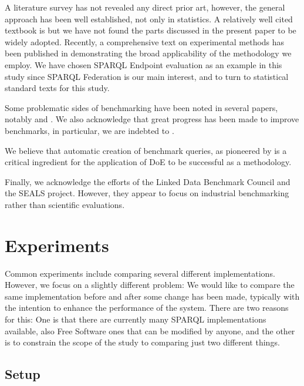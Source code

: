\documentclass{llncs}
\begin{document}
A literature survey has not revealed any direct prior art, however, the
general approach has been well established, not only in statistics. A
relatively well cited textbook is \cite{citeulike:5190414} but we have
not found the parts discussed in the present paper to be widely
adopted. Recently, a comprehensive text on experimental methods has
been published in
\cite{Springer-2010-Experimental-Methods-for-the-Analysis-of-Optimization-Algorithms}
demonstrating the broad applicability of the methodology we employ.
We have chosen SPARQL Endpoint evaluation as an example in this study
since SPARQL Federation is our main interest, and to turn to
statistical standard texts \cite{wu2009experiments} for this study.

Some problematic sides of benchmarking have been noted in several
papers, notably \cite{Duan:2011:AOC:1989323.1989340} and
\cite{MontoyaVCRA12}. We also acknowledge that great progress has been
made to improve benchmarks, in particular, we are indebted to
\cite{mxro:Morsey2011DBpedia}.

We believe that automatic creation of benchmark queries, as pioneered
by \cite{goerlitz2012splodge} is a critical ingredient for the
application of DoE to be successful as a methodology.

Finally, we acknowledge the efforts of the Linked Data Benchmark
Council and the SEALS project. However, they appear to focus on
industrial benchmarking rather than scientific evaluations.

\section{Experiments}

Common experiments include comparing several different
implementations. However, we focus on a slightly different problem: We
would like to compare the same implementation before and after some
change has been made, typically with the intention to enhance the
performance of the system. There are two reasons for this: One is that
there are currently many SPARQL implementations available, also Free
Software ones that can be modified by anyone, and the other is to
constrain the scope of the study to comparing just two different
things.

\subsection{Setup}
\end{document}
